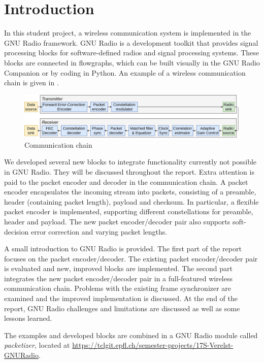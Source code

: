\section{Introduction}

In this student project, a wireless communication system is implemented in the GNU Radio framework.  GNU Radio is a development toolkit that provides signal processing blocks for software-defined radios and signal processing systems. These blocks are connected in flowgraphs, which can be built visually in the GNU Radio Companion or by coding in Python. An example of a wireless communication chain is given in .


\begin{figure}[H]
    \centering
    \includegraphics[width=1\textwidth]{img_commchain/overview.png}
    \caption{Communication chain}
    \label{fig:commchain_intro}
\end{figure}

We developed several new blocks to integrate functionality currently not possible in GNU Radio. They will be discussed throughout the report. Extra attention is paid to the packet encoder and decoder in the communication chain. A packet encoder encapsulates the incoming stream into packets, consisting of a preamble, header (containing packet length), payload and checksum. In particular, a flexible packet encoder is implemented, supporting different constellations for preamble, header and payload. The new packet encoder/decoder pair also supports soft-decision error correction and varying packet lengths.\medskip

A small introduction to GNU Radio is provided. The first part of the report focuses on the packet encoder/decoder. The existing packet encoder/decoder pair is evaluated and new, improved blocks are implemented. The second part integrates the new packet encoder/decoder pair in a full-featured wireless communication chain. Problems with the existing frame synchronizer are examined and the improved implementation is discussed. At the end of the report, GNU Radio challenges and limitations are discussed as well as some lessons learned. \medskip

The examples and developed blocks are combined in a GNU Radio module called \textit{packetizer}, located at \url{https://tclgit.epfl.ch/semester-projects/17S-Verelst-GNURadio}.

